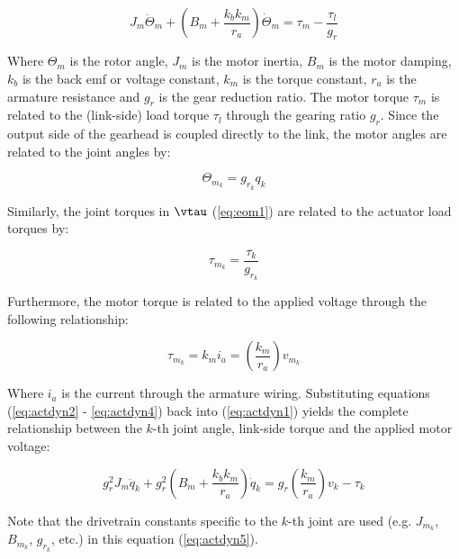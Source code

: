 \begin{equation}
	{J_m}{\ddot \Theta _m} + \left( {{B_m} + \frac{{{k_b}{k_m}}}{{{r_a}}}} \right)\dot \Theta _m  = {\tau _m} - \frac{{{\tau _l}}}{{{g_r}}}
	\label{eq:actdyn1}
\end{equation}

Where $\Theta _m$ is the rotor angle, $J_m$ is the motor inertia, $B_m$ is the motor damping, $k_b$ is the back emf or voltage constant, $k_m$ is the torque constant, $r_a$ is the armature resistance and $g_r$ is the gear reduction ratio. The motor torque $\tau _m$ is related to the (link-side) load torque $\tau _l$ through the gearing ratio $g_r$. Since the output side of the gearhead is coupled directly to the link, the motor angles are related to the joint angles by: 

\begin{equation}
	{\Theta _{m_k}} = {g _{r_k}} {q _k}
	\label{eq:actdyn2} 
\end{equation}

Similarly, the joint torques in $\vtau$ (\ref{eq:eom1}) are related to the actuator load torques by: 

\begin{equation}
	{\tau _{m_k}} = {\frac{\tau _{k}}{g _{r_k}}} 
	\label{eq:actdyn3}
\end{equation}

Furthermore, the motor torque is related to the applied voltage through the following relationship: 

\begin{equation}
	{\tau _{m_k}} = {k_m} {i_a} = \left( {\frac{{{k_m}}}{{{r_a}}}} \right){v _{m_k}}
	\label{eq:actdyn4}
\end{equation}


Where $i_a$ is the current through the armature wiring. Substituting equations (\ref{eq:actdyn2} - \ref{eq:actdyn4}) back into (\ref{eq:actdyn1}) yields the complete relationship between the $k$-th joint angle, link-side torque and the applied motor voltage:

\begin{equation}
	g_r^2{J_m}{\ddot q_k} + g_r^2\left( {{B_m} + \frac{{{k_b}{k_m}}}{{{r_a}}}} \right){\dot q_k} = g_r^{}\left( {\frac{{{k_m}}}{{{r_a}}}} \right){v_k} - {\tau _k}
	\label{eq:actdyn5}
\end{equation}

Note that the drivetrain constants specific to the $k$-th joint are used (e.g. ${J _{m_k}}$, ${B _{m_k}}$, $g _{r_k}$, etc.) in this equation (\ref{eq:actdyn5}). 

